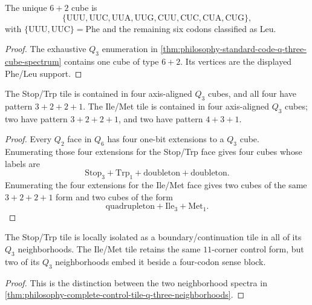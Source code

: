 \begin{corollary}
\label{cor:philosophy-phe-leu-unique-six-two-cube}
The unique $6+2$ cube is
$$
  \{\mathrm{UUU},\mathrm{UUC},\mathrm{UUA},\mathrm{UUG},
    \mathrm{CUU},\mathrm{CUC},\mathrm{CUA},\mathrm{CUG}\},
$$
with $\{\mathrm{UUU},\mathrm{UUC}\}=\mathrm{Phe}$ and the remaining
six codons classified as $\mathrm{Leu}$.
\end{corollary}
\begin{proof}
The exhaustive $Q_{3}$ enumeration in
\autoref{thm:philosophy-standard-code-q-three-cube-spectrum} contains
one cube of type $6+2$. Its vertices are the displayed Phe/Leu support.
\end{proof}

\begin{theorem}
\label{thm:philosophy-complete-control-tile-q-three-neighborhoods}
The Stop/Trp tile is contained in four axis-aligned $Q_{3}$ cubes, and
all four have pattern $3+2+2+1$. The Ile/Met tile is contained in four
axis-aligned $Q_{3}$ cubes; two have pattern $3+2+2+1$, and two have
pattern $4+3+1$.
\end{theorem}
\begin{proof}
Every $Q_{2}$ face in $Q_{6}$ has four one-bit extensions to a $Q_{3}$
cube. Enumerating those four extensions for the Stop/Trp face gives
four cubes whose labels are
$$
  \mathrm{Stop}_{3}+\mathrm{Trp}_{1}
  +\text{doubleton}+\text{doubleton}.
$$
Enumerating the four extensions for the Ile/Met face gives two cubes of
the same $3+2+2+1$ form and two cubes of the form
$$
  \text{quadrupleton}+\mathrm{Ile}_{3}+\mathrm{Met}_{1}.
$$
\end{proof}

\begin{corollary}
\label{cor:philosophy-control-tile-neighborhood-contrast}
The Stop/Trp tile is locally isolated as a boundary/continuation tile in
all of its $Q_{3}$ neighborhoods. The Ile/Met tile retains the same
$11$-corner control form, but two of its $Q_{3}$ neighborhoods embed it
beside a four-codon sense block.
\end{corollary}
\begin{proof}
This is the distinction between the two neighborhood spectra in
\autoref{thm:philosophy-complete-control-tile-q-three-neighborhoods}.
\end{proof}

